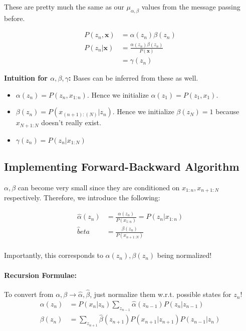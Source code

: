 \documentclass[a4paper,12pt]{report}
\begin{document}
These are pretty much the same as our $\mu_{\alpha,\beta}$ values from the message passing before.

\begin{equation}
\begin{split}
P(z_n, \pmb x) &= \alpha(z_n) \beta(z_n) \\
P(z_n | \pmb x) &= \frac{\alpha(z_n)\beta(z_n)}{P(\pmb x)} \\
&= \gamma(z_n)
\end{split}
\end{equation}

\textbf{Intuition for $\alpha, \beta, \gamma$:} Bases can be inferred from these as well.
\begin{itemize}
\item $\alpha(z_n) = P(z_n, x_{1:n})$. Hence we initialize $\alpha(z_1) = P(z_1, x_1)$.
\item $\beta(z_n) = P( x_{(n+1):(N)} | z_n)$. Hence we initialize $\beta(z_N) = 1$ because $x_{N+1:N}$ doesn't really exist.
\item $\gamma (z_n) = P(z_n | x_{1:N})$
\end{itemize}


\subsection{Implementing Forward-Backward Algorithm}

$\alpha, \beta$ can become very small since they are conditioned on $x_{1:n}, x_{n+1:N}$ respectively. Therefore, we introduce the following:

\begin{equation}
\begin{split}
\hat \alpha(z_n) &= \frac{\alpha(z_n)}{P(x_{1:n})} = P(z_n | x_{1:n}) \\
\hat beta &= \frac{\beta(z_n)}{P(x_{n+1:N})} \\
\end{split}
\end{equation}

Importantly, this corresponds to $\alpha(z_n), \beta(z_n)$ being normalized!

\paragraph{Recursion Formulae: } To convert from $\alpha, \beta \to \hat\alpha, \hat\beta$, just normalize them w.r.t. possible states for $z_n$!
\begin{equation}
\begin{split}
\alpha(z_n) &= P(x_n | z_n) \sum_{z_{n-1}}^{} \hat\alpha(z_{n-1}) P(z_n | z_{n-1}) \\
\beta(z_n) &= \sum_{z_{n+1}}^{} \hat\beta(z_{n+1}) P(x_{n+1} | z_{n+1}) P(z_{n-1} | z_n) \\
\end{split}
\end{equation}
\end{document}
